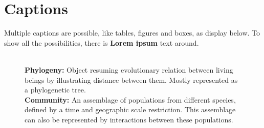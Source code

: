 \documentclass[12pt,a4paper,notitlepage,colorinlistoftodos]{article}
\newcommand{\defi}[2]{\textbf{#1: }{#2}}
\begin{document}
\section{Captions}

Multiple captions are possible, like tables, figures and boxes, as display below. To show all the possibilities, there is \textbf{Lorem ipsum} text around. 

\begin{figure}
\begin{wordbox}
 \\ \defi{Phylogeny}{Object resuming evolutionary relation between living beings by illustrating distance between them. Mostly represented as a phylogenetic tree.}\\
\defi{Community}{An assemblage of populations from different species, defined by a time and geographic scale restriction. This assemblage can also be represented by interactions between these populations.}\\
\end{wordbox}
\end{figure}

\lipsum[1-3]
\end{document}
